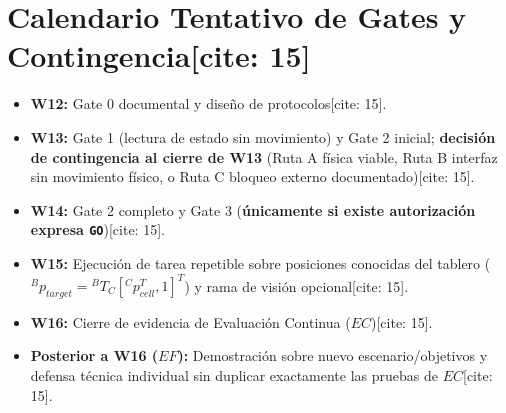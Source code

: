 \documentclass[11pt, a4paper]{article}
\begin{document}
\section{Calendario Tentativo de Gates y Contingencia[cite: 15]}
\begin{itemize}
    \item \textbf{W12:} Gate 0 documental y diseño de protocolos[cite: 15].
    \item \textbf{W13:} Gate 1 (lectura de estado sin movimiento) y Gate 2 inicial; \textbf{decisión de contingencia al cierre de W13} (Ruta A física viable, Ruta B interfaz sin movimiento físico, o Ruta C bloqueo externo documentado)[cite: 15].
    \item \textbf{W14:} Gate 2 completo y Gate 3 (\textbf{únicamente si existe autorización expresa \texttt{GO}})[cite: 15].
    \item \textbf{W15:} Ejecución de tarea repetible sobre posiciones conocidas del tablero (${}^Bp_{target} = {}^BT_C [{}^Cp_{cell}^T, 1]^T$) y rama de visión opcional[cite: 15].
    \item \textbf{W16:} Cierre de evidencia de Evaluación Continua ($EC$)[cite: 15].
    \item \textbf{Posterior a W16 ($EF$):} Demostración sobre nuevo escenario/objetivos y defensa técnica individual sin duplicar exactamente las pruebas de $EC$[cite: 15].
\end{itemize}
\end{document}
